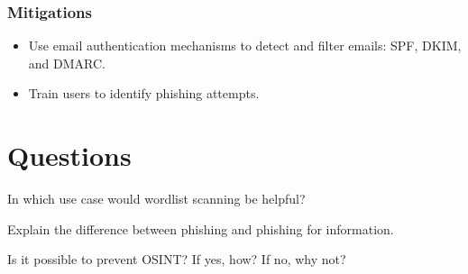\subsection{Mitigations}
\begin{itemize}
    \item Use email authentication mechanisms to detect and filter emails: SPF, DKIM, and DMARC.
    \item Train users  to identify phishing attempts.
\end{itemize}

\newpage
\chapter{Questions}
\begin{question}[Question]
    In which use case would wordlist scanning be helpful?
\end{question}
\begin{question}[Answer]
    \vspace{3cm}
\end{question}

\begin{question}[Question]
    Explain the difference between phishing and phishing for information.
\end{question}
\begin{question}[Answer]
    \vspace{3cm}
\end{question}

\begin{question}[Question]
   Is it possible to prevent OSINT? If yes, how? If no, why not?
\end{question}
\begin{question}[Answer]
    \vspace{3cm}
\end{question}